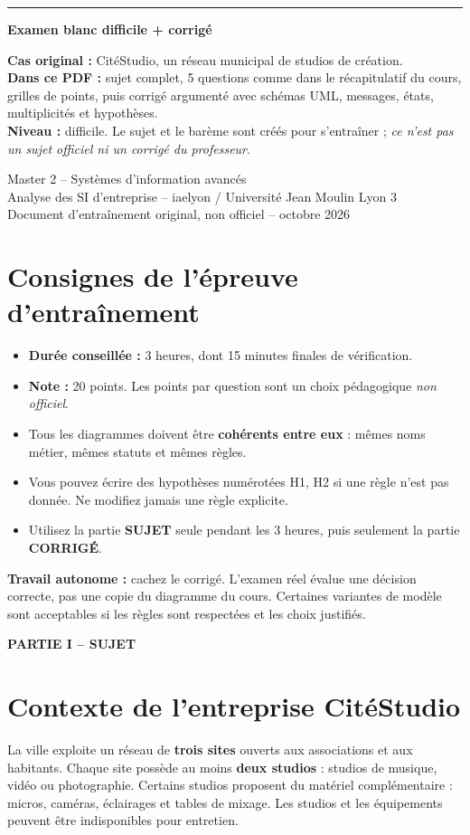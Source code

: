 \documentclass[10pt,a4paper]{article}
\newcommand{\cover}[3]{
\thispagestyle{empty}
\vspace*{27mm}
{\color{teal}\rule{25mm}{3pt}}\par\vspace{12mm}
{\huge\bfseries\color{navy} #1\par}
\vspace{5mm}{\Large\color{teal}#2\par}
\vspace{13mm}\begin{tcolorbox}[colback=pale,colframe=teal!40,boxrule=.3pt]
#3
\end{tcolorbox}
\vfill
{\small\color{bodygray} Master 2 -- Systèmes d'information avancés\\
Analyse des SI d'entreprise -- iaelyon / Université Jean Moulin Lyon 3\\
Document d'entraînement original, non officiel -- octobre 2026}
\newpage
}
\begin{document}
\cover{Examen blanc difficile + corrigé}{Une seule étude de cas -- 3 heures -- 20 points}{\textbf{Cas original :} CitéStudio, un réseau municipal de studios de création.\\[3pt]
\textbf{Dans ce PDF :} sujet complet, 5 questions comme dans le récapitulatif du cours, grilles de points, puis corrigé argumenté avec schémas UML, messages, états, multiplicités et hypothèses.\\[3pt]
\textbf{Niveau :} difficile. Le sujet et le barème sont créés pour s'entraîner ; \emph{ce n'est pas un sujet officiel ni un corrigé du professeur}.}
\section*{Consignes de l'épreuve d'entraînement}
\begin{itemize}
\item \textbf{Durée conseillée :} 3 heures, dont 15 minutes finales de vérification.
\item \textbf{Note :} 20 points. Les points par question sont un choix pédagogique \emph{non officiel}.
\item Tous les diagrammes doivent être \textbf{cohérents entre eux} : mêmes noms métier, mêmes statuts et mêmes règles.
\item Vous pouvez écrire des hypothèses numérotées H1, H2 si une règle n'est pas donnée. Ne modifiez jamais une règle explicite.
\item Utilisez la partie \textbf{SUJET} seule pendant les 3 heures, puis seulement la partie \textbf{CORRIGÉ}.
\end{itemize}
\begin{tcolorbox}[colback=warm,colframe=orange!55!black]
\textbf{Travail autonome :} cachez le corrigé. L'examen réel évalue une décision correcte, pas une copie du diagramme du cours. Certaines variantes de modèle sont acceptables si les règles sont respectées et les choix justifiés.
\end{tcolorbox}
\newpage
\begin{center}{\Large\bfseries\color{teal} PARTIE I -- SUJET}\end{center}
\section{Contexte de l'entreprise CitéStudio}
La ville exploite un réseau de \textbf{trois sites} ouverts aux associations et aux habitants. Chaque site possède au moins \textbf{deux studios} : studios de musique, vidéo ou photographie. Certains studios proposent du matériel complémentaire : micros, caméras, éclairages et tables de mixage. Les studios et les équipements peuvent être indisponibles pour entretien.
\end{document}
